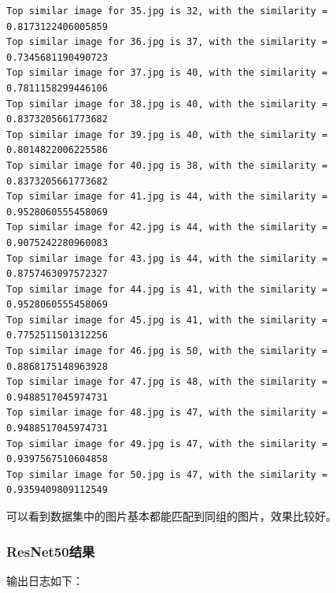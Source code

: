 \documentclass{article}
\begin{document}
\begin{lstlisting}
Top similar image for 35.jpg is 32, with the similarity = 0.8173122406005859
Top similar image for 36.jpg is 37, with the similarity = 0.7345681190490723
Top similar image for 37.jpg is 40, with the similarity = 0.7811158299446106
Top similar image for 38.jpg is 40, with the similarity = 0.8373205661773682
Top similar image for 39.jpg is 40, with the similarity = 0.8014822006225586
Top similar image for 40.jpg is 38, with the similarity = 0.8373205661773682
Top similar image for 41.jpg is 44, with the similarity = 0.9528060555458069
Top similar image for 42.jpg is 44, with the similarity = 0.9075242280960083
Top similar image for 43.jpg is 44, with the similarity = 0.8757463097572327
Top similar image for 44.jpg is 41, with the similarity = 0.9528060555458069
Top similar image for 45.jpg is 41, with the similarity = 0.7752511501312256
Top similar image for 46.jpg is 50, with the similarity = 0.8868175148963928
Top similar image for 47.jpg is 48, with the similarity = 0.9488517045974731
Top similar image for 48.jpg is 47, with the similarity = 0.9488517045974731
Top similar image for 49.jpg is 47, with the similarity = 0.9397567510604858
Top similar image for 50.jpg is 47, with the similarity = 0.9359409809112549

\end{lstlisting}

    可以看到数据集中的图片基本都能匹配到同组的图片，效果比较好。

\subsubsection{ResNet50结果}

    输出日志如下：
\end{document}
